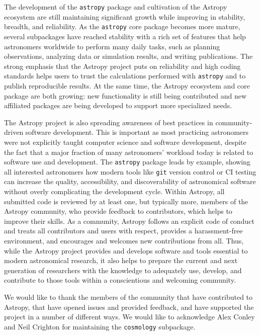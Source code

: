 \documentclass[modern]{aastex61}
\newcommand{\package}[1]{\texttt{#1}\xspace}
\newcommand{\astropy}{Astropy\xspace}
\newcommand{\astropypkg}{\package{astropy}}
\begin{document}
The development of the \astropypkg package and cultivation of the \astropy
ecosystem are still maintaining significant growth while improving in stability,
breadth, and reliability.
As the \astropypkg core package becomes more mature, several subpackages have
reached stability with a rich set of features that help astronomers worldwide to
perform many daily tasks, such as planning observations, analyzing data or
simulation results, and writing publications.
The strong emphasis that the \astropy project puts on reliability and high coding
standards helps users to trust the calculations performed with \astropypkg and
to publish reproducible results.
At the same time, the \astropy ecosystem and core package are both growing: new
functionality is still being contributed and new affiliated packages are being
developed to support more specialized needs.

The \astropy project is also spreading awareness of best practices in
community-driven software development.
This is important as most practicing astronomers were not explicitly taught
computer science and software development, despite the fact that a major
fraction of many astronomers' workload today is related to software use
and development.
The \astropypkg package leads by example, showing all interested astronomers how
modern tools like \texttt{git} version control or CI testing can
increase the quality, accessibility, and discoverability of astronomical
software without overly complicating the development cycle.
Within \astropy, all submitted code is reviewed by at least one, but typically
more, members of the \astropy community, who provide feedback to contributors,
which helps to improve their skills.
As a community, \astropy follows an explicit code of conduct \citep{ape8} and treats all
contributors and users with respect, provides a harassment-free environment, and
encourages and welcomes new contributions from all.
Thus, while the \astropy project provides and develops software and tools
essential to modern astronomical research, it also helps to prepare the current
and next generation of researchers with the knowledge to adequately use,
develop, and contribute to those tools within a conscientious and welcoming
community.

\acknowledgments 

We would like to thank the members of the community that have 
contributed to \astropy, 
that have opened issues and provided feedback, and have supported the 
project in a number of different ways.  We would like to acknowledge
Alex Conley and Neil Crighton for maintaining the  \package{cosmology} 
subpackage. 
\end{document}
